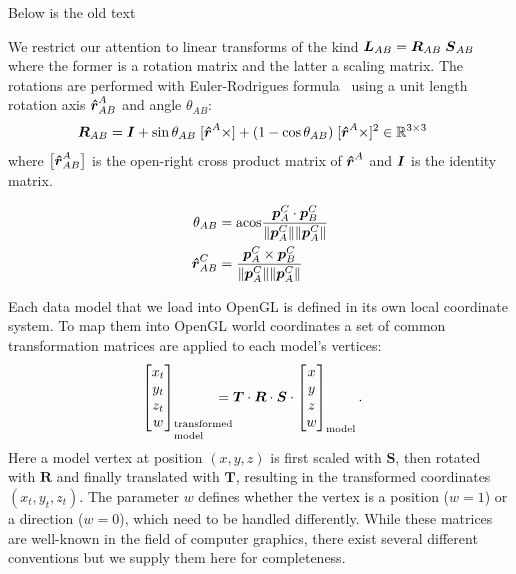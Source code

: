 {\color{blue}Below is the old text}

We restrict our attention to linear transforms of the kind $\boldsymbol{L}_{AB} = \boldsymbol{R}_{AB}\;\boldsymbol{S}_{AB}$ where the former is a rotation matrix and the latter a scaling matrix. The rotations are performed with Euler-Rodrigues formula~\cite{Dai2015} using a unit length rotation axis $\boldsymbol{\hat{r}}_{AB}^A$ and angle $\theta_{AB}$:
%
\begin{align}\label{eq:M}
\mat{R}_{AB} &= \I + \sin\theta_{AB}\;[\dvec{\hat{r}}^A\times] + (1-\cos\theta_{AB})\;[\dvec{\hat{r}}^A\times]^2 \in\mathbb{R}^{3\times3}
\end{align}
%
where $\big[\boldsymbol{\hat{r}}_{AB}^A\big]$ is the open-right cross product matrix of $\boldsymbol{\hat{r}}^A$ and $\boldsymbol{I}$ is the identity matrix. 

\begin{align}
\theta_{AB}
&= \mathrm{acos}\frac{\boldsymbol{p}_{A}^{C}\cdot\boldsymbol{p}_{B}^{C}}{\lVert\boldsymbol{p}_{A}^{C}\rVert\lVert\boldsymbol{p}_{A}^{C}\rVert} \\
\boldsymbol{\hat{r}}_{AB}^C &=  \frac{\boldsymbol{p}_{A}^{C}\times\boldsymbol{p}_{B}^{C}}{\lVert\boldsymbol{p}_{A}^{C}\rVert\lVert\boldsymbol{p}_{A}^{C}\rVert}
\end{align}


Each data model that we load into OpenGL is defined in its own local coordinate system. To map them into OpenGL world coordinates a set of common transformation matrices are applied to each model's vertices:
%
\begin{align}
\bmat{x_t \\ y_t \\ z_t \\ w}_\text{\parbox{1cm}{\setlength\baselineskip{0.3cm}transformed\\model}} &= \boldsymbol{T} \cdot \boldsymbol{R} \cdot \boldsymbol{S} \cdot \bmat{x \\ y \\ z \\ w}_\text{model}.
\end{align}
%
Here a model vertex at position $(x,y,z)$ is first scaled with $\boldsymbol{S}$, then rotated with $\boldsymbol{R}$ and finally translated with $\boldsymbol{T}$, resulting in the transformed coordinates $(x_t,y_t,z_t)$. The parameter $w$ defines whether the vertex is a position ($w=1$) or a direction ($w=0$), which need to be handled differently. While these matrices are well-known in the field of computer graphics, there exist several different conventions but we supply them here for completeness.

